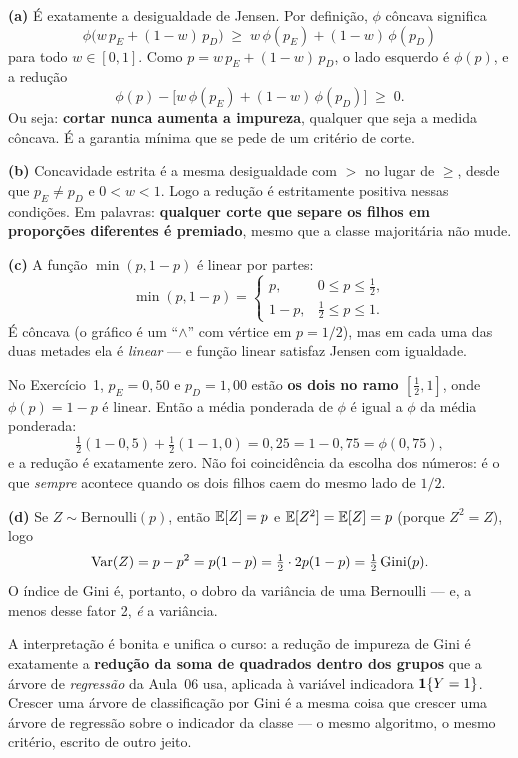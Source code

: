 \documentclass[11pt,a4paper]{article}
\begin{document}
\begin{solucao}
\textbf{(a)} É exatamente a desigualdade de Jensen. Por definição, $\phi$ côncava
significa
\[
  \phi\big(w\,p_E + (1-w)\,p_D\big) \;\ge\; w\,\phi(p_E) + (1-w)\,\phi(p_D)
\]
para todo $w\in[0,1]$. Como $p = w\,p_E+(1-w)\,p_D$, o lado esquerdo é $\phi(p)$,
e a redução
\[
  \phi(p) - \big[w\,\phi(p_E)+(1-w)\,\phi(p_D)\big] \;\ge\; 0 .
\]
Ou seja: \textbf{cortar nunca aumenta a impureza}, qualquer que seja a medida
côncava. É a garantia mínima que se pede de um critério de corte.

\smallskip
\textbf{(b)} Concavidade estrita é a mesma desigualdade com $>$ no lugar de
$\ge$, desde que $p_E\neq p_D$ e $0<w<1$. Logo a redução é estritamente positiva
nessas condições. Em palavras: \textbf{qualquer corte que separe os filhos em
proporções diferentes é premiado}, mesmo que a classe majoritária não mude.

\smallskip
\textbf{(c)} A função $\min(p,1-p)$ é linear por partes:
\[
  \min(p,1-p) = \begin{cases} p, & 0\le p\le \tfrac12,\\[2pt] 1-p, & \tfrac12\le p\le 1.\end{cases}
\]
É côncava (o gráfico é um ``$\wedge$'' com vértice em $p=1/2$), mas em cada uma
das duas metades ela é \emph{linear} --- e função linear satisfaz Jensen com
igualdade.

No Exercício~1, $p_E = 0{,}50$ e $p_D=1{,}00$ estão \textbf{os dois no ramo
$[\tfrac12, 1]$}, onde $\phi(p)=1-p$ é linear. Então a média ponderada de
$\phi$ é igual a $\phi$ da média ponderada:
\[
  \tfrac12(1-0{,}5)+\tfrac12(1-1{,}0) = 0{,}25 = 1-0{,}75 = \phi(0{,}75),
\]
e a redução é exatamente zero. Não foi coincidência da escolha dos números: é o
que \emph{sempre} acontece quando os dois filhos caem do mesmo lado de $1/2$.

\smallskip
\textbf{(d)} Se $Z\sim\text{Bernoulli}(p)$, então $\mathbb{E}[Z]=p$ e
$\mathbb{E}[Z^2]=\mathbb{E}[Z]=p$ (porque $Z^2=Z$), logo
\[
  \operatorname{Var}(Z) = p - p^2 = p(1-p) = \tfrac12\cdot 2p(1-p) = \tfrac12\,\text{Gini}(p).
\]
O índice de Gini é, portanto, o dobro da variância de uma Bernoulli --- e, a menos
desse fator 2, \emph{é} a variância.

A interpretação é bonita e unifica o curso: a redução de impureza de Gini é
exatamente a \textbf{redução da soma de quadrados dentro dos grupos} que a árvore
de \emph{regressão} da Aula~06 usa, aplicada à variável indicadora $\mathbf{1}\!\left\{Y=1\right\}$.
Crescer uma árvore de classificação por Gini é a mesma coisa que crescer uma
árvore de regressão sobre o indicador da classe --- o mesmo algoritmo, o mesmo
critério, escrito de outro jeito.
\end{solucao}
\end{document}
